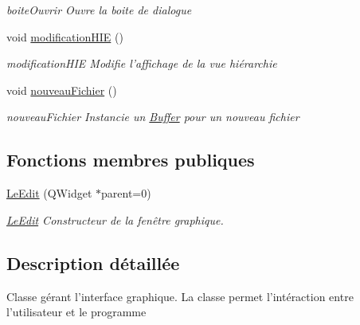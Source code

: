 \begin{DoxyCompactItemize}
\begin{DoxyCompactList}\small\item\em boiteOuvrir Ouvre la boite de dialogue \item\end{DoxyCompactList}\item 
\hypertarget{classLeEdit_aeb4d16c6b7c5345c55fd21a99011d349}{
void \hyperlink{classLeEdit_aeb4d16c6b7c5345c55fd21a99011d349}{modificationHIE} ()}
\label{classLeEdit_aeb4d16c6b7c5345c55fd21a99011d349}

\begin{DoxyCompactList}\small\item\em modificationHIE Modifie l'affichage de la vue hiérarchie \item\end{DoxyCompactList}\item 
\hypertarget{classLeEdit_ab0b3d14448d26da8388e4feea4c5f9b8}{
void \hyperlink{classLeEdit_ab0b3d14448d26da8388e4feea4c5f9b8}{nouveauFichier} ()}
\label{classLeEdit_ab0b3d14448d26da8388e4feea4c5f9b8}

\begin{DoxyCompactList}\small\item\em nouveauFichier Instancie un \hyperlink{classBuffer}{Buffer} pour un nouveau fichier \item\end{DoxyCompactList}\end{DoxyCompactItemize}
\subsection*{Fonctions membres publiques}
\begin{DoxyCompactItemize}
\item 
\hyperlink{classLeEdit_a135617402621e814b450a731e96e02fc}{LeEdit} (QWidget $\ast$parent=0)
\begin{DoxyCompactList}\small\item\em \hyperlink{classLeEdit}{LeEdit} Constructeur de la fenêtre graphique. \item\end{DoxyCompactList}\end{DoxyCompactItemize}


\subsection{Description détaillée}
Classe gérant l'interface graphique. La classe permet l'intéraction entre l'utilisateur et le programme 

